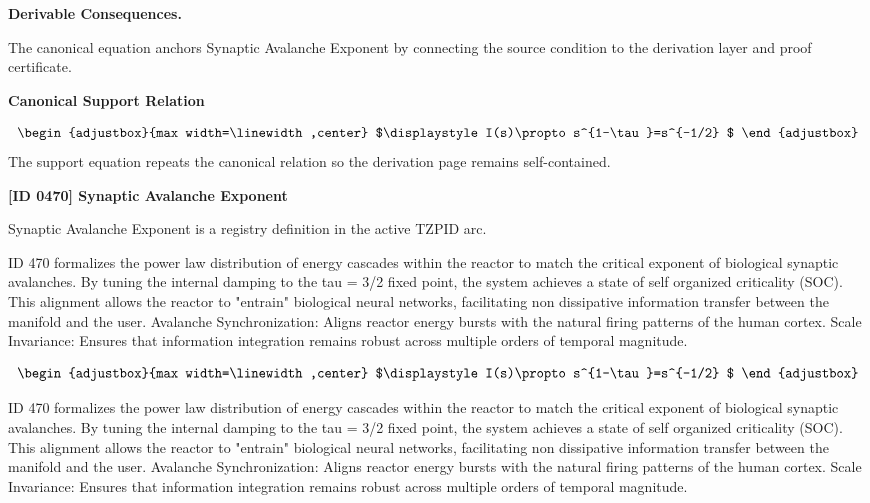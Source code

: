 \par\vspace{0.35em}
\noindent\textbf{Derivable Consequences.}\quad
\begingroup
\footnotesize
\raggedright
The canonical equation anchors Synaptic Avalanche Exponent by connecting the source condition to the derivation layer and proof certificate.
\par\endgroup

\noindent\textbf{Canonical Support Relation}\par
\[
\begin{adjustbox}{max width=\linewidth,center}
$\displaystyle
I(s)\propto s^{1-\tau}=s^{-1/2}
$
\end{adjustbox}
\]
\noindent The support equation repeats the canonical relation so the derivation page remains self-contained.\par

\clearpage
\noindent\textbf{[ID 0470] Synaptic Avalanche Exponent}\par
\vspace{0.35em}
\begingroup\small
{}
Synaptic Avalanche Exponent is a registry definition in the active TZPID arc.

ID 470 formalizes the power law distribution of energy cascades within the reactor to match the critical exponent of biological synaptic avalanches. By tuning the internal damping to the tau = 3/2 fixed point, the system achieves a state of self organized criticality (SOC). This alignment allows the reactor to "entrain" biological neural networks, facilitating non dissipative information transfer between the manifold and the user. Avalanche Synchronization: Aligns reactor energy bursts with the natural firing patterns of the human cortex. Scale Invariance: Ensures that information integration remains robust across multiple orders of temporal magnitude.

\[
\begin{adjustbox}{max width=\linewidth,center}
$\displaystyle
I(s)\propto s^{1-\tau}=s^{-1/2}
$
\end{adjustbox}
\]

ID 470 formalizes the power law distribution of energy cascades within the reactor to match the critical exponent of biological synaptic avalanches. By tuning the internal damping to the tau = 3/2 fixed point, the system achieves a state of self organized criticality (SOC). This alignment allows the reactor to "entrain" biological neural networks, facilitating non dissipative information transfer between the manifold and the user. Avalanche Synchronization: Aligns reactor energy bursts with the natural firing patterns of the human cortex. Scale Invariance: Ensures that information integration remains robust across multiple orders of temporal magnitude.

